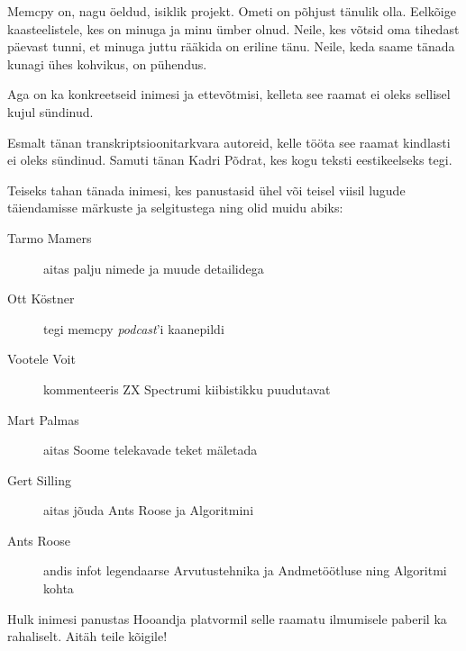 Memcpy on, nagu öeldud, isiklik projekt. Ometi on põhjust tänulik olla. 
Eelkõige kaasteelistele, kes on minuga ja minu ümber olnud. Neile, kes võtsid 
oma tihedast päevast tunni, et minuga juttu rääkida on eriline tänu. Neile, keda saame tänada
kunagi ühes kohvikus, on pühendus.

Aga on ka konkreetseid inimesi ja ettevõtmisi, kelleta see raamat ei oleks sellisel kujul sündinud. 

Esmalt tänan transkriptsioonitarkvara autoreid, kelle tööta see raamat kindlasti ei oleks sündinud. Samuti tänan Kadri Põdrat, kes kogu teksti eestikeelseks tegi. 

Teiseks tahan tänada inimesi, kes panustasid ühel või teisel viisil lugude täiendamisse märkuste ja selgitustega ning olid muidu abiks:

\begin{description}
	\item[Tarmo Mamers] aitas palju nimede ja muude detailidega
	\item[Ott Köstner] tegi memcpy \emph{podcast}'i kaanepildi
	\item[Vootele Voit] kommenteeris 
 ZX Spectrumi kiibistikku puudutavat
	\item[Mart Palmas] aitas Soome telekavade teket mäletada 
	\item[Gert Silling] aitas jõuda Ants Roose ja Algoritmini 
	\item[Ants Roose] andis infot legendaarse Arvutustehnika ja Andmetöötluse ning Algoritmi kohta 
\end{description}

Hulk inimesi panustas Hooandja platvormil selle raamatu ilmumisele paberil ka rahaliselt. Aitäh teile kõigile!

